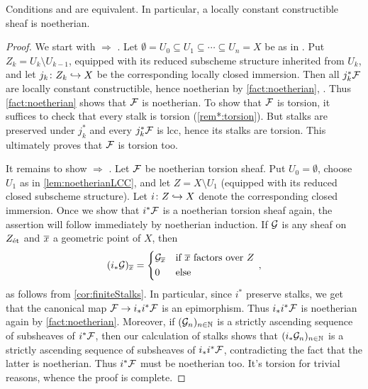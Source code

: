 \begin{lem}\label{lem:c1<=>c3}
	Conditions  and  are equivalent. In particular, a locally constant constructible sheaf is noetherian.
\end{lem}
\begin{proof}
	We start with  $\Rightarrow$ . Let $\emptyset =U_0\subseteq U_1\subseteq\dotsb\subseteq U_n=X$ be as in . Put $Z_k=U_k\setminus U_{k-1}$, equipped with its reduced subscheme structure inherited from $U_k$, and let $j_k\colon Z_k\monomorphism X$ be the corresponding locally closed immersion. Then all $j_k^*\mathcal{F}$ are locally constant constructible, hence noetherian by \cref{fact:noetherian}, . Thus \cref{fact:noetherian} shows that $\mathcal{F}$ is noetherian. To show that $\mathcal{F}$ is torsion, it suffices to check that every stalk is torsion (\cref{rem*:torsion}). But stalks are preserved under $j_k^*$ and every $j_k^*\mathcal{F}$ is lcc, hence its stalks are torsion. This ultimately proves that $\mathcal{F}$ is torsion too.
	
	It remains to show  $\Rightarrow$ . Let $\mathcal{F}$ be noetherian torsion sheaf. Put $U_0=\emptyset$, choose $U_1$ as in \cref{lem:noetherianLCC}, and let $Z=X\setminus U_1$ (equipped with its reduced closed subscheme structure). Let $i\colon Z\monomorphism X$ denote the corresponding closed immersion. Once we show that $i^*\mathcal{F}$ is a noetherian torsion sheaf again, the assertion will follow immediately by noetherian induction. If $\mathcal{G}$ is any sheaf on $Z_{\mathrm{\acute{e}t}}$ and $\ov{x}$ a geometric point of $X$, then
	\begin{equation*}
		(i_*\Gg)_{\ov{x}}=\begin{cases*}
		\Gg_{\ov{x}} & if $\ov{x}$ factors over $Z$\\
		0 & else
		\end{cases*}\,,
	\end{equation*}
	as follows from \cref{cor:finiteStalks}. In particular, since $i^*$ preserve stalks, we get that the canonical map $\Ff\morphism i_*i^*\Ff$ is an epimorphism. Thus $i_*i^*\mathcal{F}$ is noetherian again by \cref{fact:noetherian}. Moreover, if $(\mathcal{G}_n)_{n\in \mathbb{N}}$ is a strictly ascending sequence of subsheaves of $i^*\mathcal{F}$, then our calculation of stalks shows that $(i_*\mathcal{G}_n)_{n\in \mathbb{N}}$ is a strictly ascending sequence of subsheaves of $i_*i^*\mathcal{F}$, contradicting the fact that the latter is noetherian. Thus $i^*\mathcal{F}$ must be noetherian too. It's torsion for trivial reasons, whence the proof is complete.
\end{proof}
